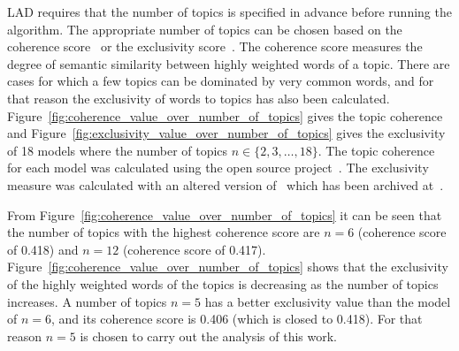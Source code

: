 \documentclass{article}
\theoremstyle{definition}
\begin{document}
LAD requires that the number of topics is specified in advance before running
the algorithm. The appropriate number of topics can be chosen based on the
coherence score~\cite{Roder2015} or the exclusivity score~\cite{Airoldi2012}. The
coherence score measures the degree of semantic similarity between highly weighted
words of a topic. There are cases for which a few topics can be dominated by very
common words, and for that reason the exclusivity of words to topics has also
been calculated.
Figure~\ref{fig:coherence_value_over_number_of_topics} gives the topic coherence
and Figure~\ref{fig:exclusivity_value_over_number_of_topics} gives the
exclusivity of 18 models where the number of topics \(n \in \{2, 3, \dots, 18\}\).
The topic coherence for each model was calculated using the
open source project~\cite{rehurek_lrec}. The exclusivity measure was calculated
with an altered version of~\cite{rehurek_lrec} which has been archived
at~\cite{gensim_nikoleta}.

From Figure~\ref{fig:coherence_value_over_number_of_topics} it can be seen that
the number of topics with the highest coherence score are $n=6$ (coherence score
of 0.418) and $n=12$ (coherence score of 0.417).
Figure~\ref{fig:coherence_value_over_number_of_topics} shows that the
exclusivity of the highly weighted words of the topics is decreasing as the number
of topics increases. A number of topics $n=5$ has a better exclusivity value
than the model of $n=6$, and its coherence score is 0.406 (which is closed to
0.418). For that reason $n=5$ is chosen to carry out the analysis of this work.
\end{document}

